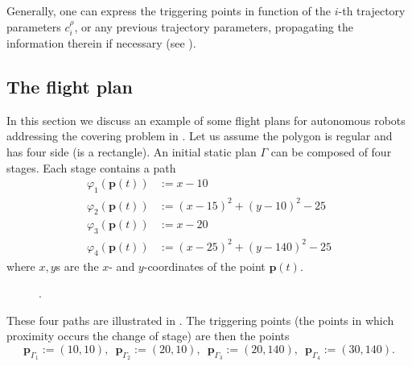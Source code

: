 Generally, one can express the triggering points in function of the $i$-th trajectory parameters $c_{i}^{\rho}$, or any previous trajectory parameters, propagating the information therein if necessary (see ).

\subsection{\color{cyan}The flight plan}
\label{sec:flight-plan}

In this section we discuss an example of some flight plans for autonomous robots addressing the covering problem in . Let us assume the polygon is regular and has four side (is a rectangle). An initial static plan $\Gamma$ can be composed of four stages. Each stage contains a path
\begin{subequations}\label{eq:basic-plan}\begin{align}
  \varphi_1(\mathbf{p}(t))&:=x-10\\
  \varphi_2(\mathbf{p}(t))&:=(x-15)^2+(y-10)^2-25\\
  \varphi_3(\mathbf{p}(t))&:=x-20\\
  \varphi_4(\mathbf{p}(t))&:=(x-25)^2+(y-140)^2-25
\end{align}\end{subequations}
where $x,y$s are the $x$- and $y$-coordinates of the point $\mathbf{p}(t)$.

\begin{figure}[t]
  \centering
  
  \caption[.]{.}
  \label{fig:plot3}
\end{figure}

These four paths are illustrated in . The triggering points (the points in which proximity occurs the change of stage) are then the points
\begin{equation}\label{eq:basic-plan-trigs}
  \mathbf{p}_{\Gamma_1}:=(10,10),\,\,\,\mathbf{p}_{\Gamma_2}:=(20,10),\,\,\,\mathbf{p}_{\Gamma_3}:=(20,140),\,\,\,\mathbf{p}_{\Gamma_4}:=(30,140).
\end{equation}

